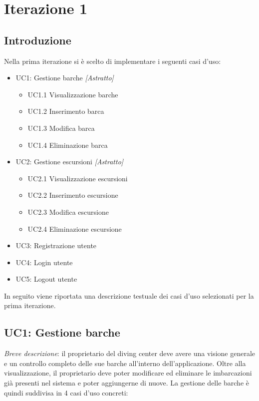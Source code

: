 \section{Iterazione 1}

\subsection{Introduzione}
Nella prima iterazione si è scelto di implementare i seguenti casi d'uso:

\begin{itemize}
    \item UC1: Gestione barche \textit{[Astratto]}
          \begin{itemize}
              \item UC1.1 Visualizzazione barche
              \item UC1.2 Inserimento barca
              \item UC1.3 Modifica barca
              \item UC1.4 Eliminazione barca
          \end{itemize}
    \item UC2: Gestione escursioni \textit{[Astratto]}
          \begin{itemize}
              \item UC2.1 Visualizzazione escursioni
              \item UC2.2 Inserimento escursione
              \item UC2.3 Modifica escursione
              \item UC2.4 Eliminazione escursione
          \end{itemize}
    \item UC3: Registrazione utente
    \item UC4: Login utente
    \item UC5: Logout utente
\end{itemize}
In seguito viene riportata una descrizione testuale dei casi d'uso selezionati per la prima iterazione.

\clearpage

\subsection{UC1: Gestione barche}

\emph{Breve descrizione}: il proprietario del diving center deve avere una visione generale e un controllo completo delle sue barche all'interno dell'applicazione.
Oltre alla visualizzazione, il proprietario deve poter modificare ed eliminare le imbarcazioni già presenti nel sistema e poter aggiungerne di nuove.
La gestione delle barche è quindi suddivisa in 4 casi d'uso concreti:

